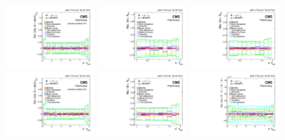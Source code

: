 \begin{figure}[!h]
 \begin{center}
  \includegraphics[width=0.30\textwidth]{Figures/WBoson/Analysis/Systematics/Combined/PA/Cross_Section/gr_WToMuMi_PA_Cross_Section_EffTnP.pdf}
  \includegraphics[width=0.30\textwidth]{Figures/WBoson/Analysis/Systematics/Combined/PA/ForwardBackward_Ratio/gr_WToMuMi_PA_ForwardBackward_Ratio_EffTnP.pdf}
  \includegraphics[width=0.30\textwidth]{Figures/WBoson/Analysis/Systematics/Combined/PA/ForwardBackward_Ratio/gr_WToMuInc_PA_ForwardBackward_Ratio_EffTnP.pdf}
  \includegraphics[width=0.30\textwidth]{Figures/WBoson/Analysis/Systematics/Combined/PA/Cross_Section/gr_WToMuPl_PA_Cross_Section_EffTnP.pdf}
  \includegraphics[width=0.30\textwidth]{Figures/WBoson/Analysis/Systematics/Combined/PA/ForwardBackward_Ratio/gr_WToMuPl_PA_ForwardBackward_Ratio_EffTnP.pdf}
  \includegraphics[width=0.30\textwidth]{Figures/WBoson/Analysis/Systematics/Combined/PA/Charge_Asymmetry/gr_WToMuInc_PA_Charge_Asymmetry_EffTnP.pdf}

\end{center}
\end{figure}
